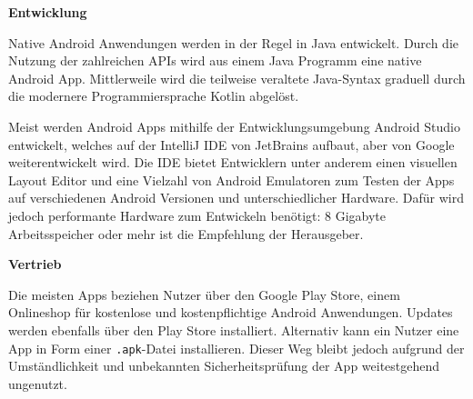 \textbf{Entwicklung}


Native Android Anwendungen werden in der Regel in Java entwickelt. Durch die Nutzung der zahlreichen APIs wird aus einem Java Programm eine native Android App.
\cite[S. 1]{JavaForAndroid}
Mittlerweile wird die teilweise veraltete Java-Syntax graduell durch die modernere Programmiersprache Kotlin abgelöst.
\cite{KotlinAndroid}




Meist werden Android Apps mithilfe der Entwicklungsumgebung Android Studio entwickelt, welches auf der IntelliJ IDE von JetBrains aufbaut, aber von Google weiterentwickelt wird. Die IDE bietet Entwicklern unter anderem einen visuellen Layout Editor und eine Vielzahl von Android Emulatoren zum Testen der Apps auf verschiedenen Android Versionen und unterschiedlicher Hardware. Dafür wird jedoch performante Hardware zum Entwickeln benötigt: 8 Gigabyte Arbeitsspeicher oder mehr ist die Empfehlung der Herausgeber. \cite{AndroidStudio}

\textbf{Vertrieb}

Die meisten Apps beziehen Nutzer über den Google Play Store, einem Onlineshop für kostenlose und kostenpflichtige Android Anwendungen. 
Updates werden ebenfalls über den Play Store installiert. Alternativ kann ein Nutzer eine App in Form einer \texttt{.apk}-Datei installieren. Dieser Weg bleibt jedoch aufgrund der Umständlichkeit und unbekannten Sicherheitsprüfung der App weitestgehend ungenutzt.
